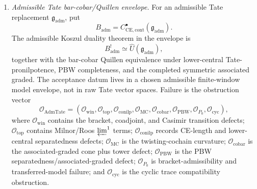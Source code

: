 \begin{enumerate}
\[\begin{aligned}
       &-(\pi_{M,N}x)\cdot_N(\pi^\vee_{M,N}\lambda),
    \end{aligned}
  \]
  Their vanishing gives the pro coordinate-window comparison
	  \[
	    \Phi_{\mathrm{coord}}\colon
	    C^\bullet_{\mathrm{CE},\mathrm{coord}}(\mathfrak g)
	    \xrightarrow{\sim}
	    \mathrm{PV}_{\mathrm{coord}}(A_{\partial,\mathrm{coord}}).
	  \]
  On a bracket-admissible \(B\) the restricted map
  \[
    \Phi^B_{P_0}\colon
    \Phi_{\mathrm{coord}}^{-1}(B)\xrightarrow{\sim}B
  \]
  is the corresponding completed \(P_0\)-comparison.
  The Casimir transition term
  \[
    \mathfrak o^{\mathrm{Cas}}_{M,N}
      =(\pi_{M,N}\otimes\pi^\vee_{M,N})C_M-C_N
  \]
  diagnoses the failure of a strict global kernel, propagator, endpoint,
  ambient-product bracket, and bar-cobar/enveloping comparison in the unweighted
  product/direct-sum topology.  It is not an additional hypothesis for
  each coordinate-window CE/PV identity.

  \item \emph{Admissible Tate bar-cobar/Quillen envelope.}
  For an admissible Tate replacement
  \(\mathfrak g_{\mathrm{adm}}\), put
  \[
    B_{\mathrm{adm}}=
    C^\bullet_{\mathrm{CE},\mathrm{cont}}(\mathfrak g_{\mathrm{adm}}).
  \]
  The admissible Koszul duality theorem in the envelope is
  \[
    B_{\mathrm{adm}}^!\simeq
    \widehat U(\mathfrak g_{\mathrm{adm}}),
  \]
  together with the bar-cobar Quillen equivalence under lower-central
  Tate-pronilpotence, PBW completeness, and the completed symmetric
  associated graded.  The acceptance datum lives in a chosen admissible
  finite-window model envelope, not in raw Tate vector spaces.  Failure is
  the obstruction vector
  \[
    \mathcal O_{\mathrm{AdmTate}}
    =
    (\mathcal O_{\mathrm{win}},
     \mathcal O_{\mathrm{top}},
     \mathcal O_{\mathrm{conilp}},
     \mathcal O_{\mathrm{MC}},
     \mathcal O_{\mathrm{cobar}},
     \mathcal O_{\mathrm{PBW}},
     \mathcal O_{P_0},
     \mathcal O_{\mathrm{cyc}}),
  \]
  where \(\mathcal O_{\mathrm{win}}\) contains the bracket, coadjoint,
  and Casimir transition defects; \(\mathcal O_{\mathrm{top}}\) contains
  Milnor/Roos \(\varprojlim^1\) terms; \(\mathcal O_{\mathrm{conilp}}\)
  records CE-length and lower-central separatedness defects;
  \(\mathcal O_{\mathrm{MC}}\) is the twisting-cochain curvature;
  \(\mathcal O_{\mathrm{cobar}}\) is the associated-graded cone plus
  tower defect; \(\mathcal O_{\mathrm{PBW}}\) is the PBW
  separatedness/associated-graded defect; \(\mathcal O_{P_0}\) is
  bracket-admissibility and transferred-model failure; and
  \(\mathcal O_{\mathrm{cyc}}\) is the cyclic trace compatibility
  obstruction.


\end{enumerate}
